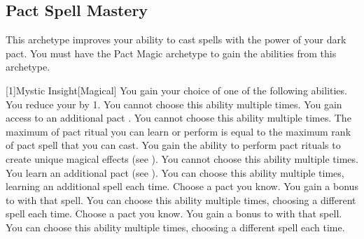 



    \subsection{Pact Spell Mastery}
        This archetype improves your ability to cast spells with the power of your dark pact.
        You must have the Pact Magic archetype to gain the abilities from this archetype.

        [1]{Mystic Insight}[Magical] You gain your choice of one of the following abilities.
        {
             You reduce your  by 1.
                You cannot choose this ability multiple times.
             You gain access to an additional pact .
                You cannot choose this ability multiple times.
             The maximum  of pact ritual you can learn or perform is equal to the maximum rank of pact spell that you can cast.
                You gain the ability to perform pact rituals to create unique magical effects (see ).
                You cannot choose this ability multiple times.
             You learn an additional pact  (see ).
                You can choose this ability multiple times, learning an additional spell each time.
             Choose a pact  you know.
                You gain a  bonus to  with that spell.
                You can choose this ability multiple times, choosing a different spell each time.
             Choose a pact  you know.
                You gain a  bonus to  with that spell.
                You can choose this ability multiple times, choosing a different spell each time.
        }

